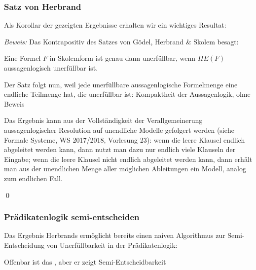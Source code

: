 \documentclass[aspectratio=1610,onlymath]{beamer}
\begin{document}
\begin{frame}\frametitle{Satz von Herbrand}

Als Korollar der gezeigten Ergebnisse erhalten wir ein wichtiges Resultat:


\pause\emph{Beweis:} Das Kontrapositiv des Satzes von Gödel, Herbrand \& Skolem besagt:\medskip

Eine Formel $F$ in Skolemform ist genau dann unerfüllbar, wenn $HE(F)$ aussagenlogisch unerfüllbar ist.\bigskip

Der Satz folgt nun, weil jede unerfüllbare aussagenlogische Formelmenge eine endliche
Teilmenge hat, die unerfüllbar ist: \alert{Kompaktheit der Aussagenlogik}, ohne Beweis\\[1ex]
{\tiny
\textcolor{devilscss}{Das Ergebnis kann aus der Vollständigkeit der Verallgemeinerung aussagenlogischer Resolution auf unendliche Modelle gefolgert werden (siehe Formale Systeme, WS 2017/2018, Vorlesung 23): wenn die leere Klausel endlich abgeleitet werden kann, dann nutzt man dazu nur endlich viele Klauseln der Eingabe; wenn die leere Klausel nicht endlich abgeleitet werden kann, dann erhält man aus der unendlichen Menge aller möglichen Ableitungen ein Modell, analog zum endlichen Fall.}

}\qed

\end{frame}

\begin{frame}\frametitle{Prädikatenlogik semi-entscheiden}

Das Ergebnis Herbrands ermöglicht bereits einen naiven Algorithmus zur Semi-Entscheidung von Unerfüllbarkeit in der Prädikatenlogik:\bigskip

\medskip

Offenbar ist das , aber er zeigt Semi-Entscheidbarkeit

\end{frame}
\end{document}
